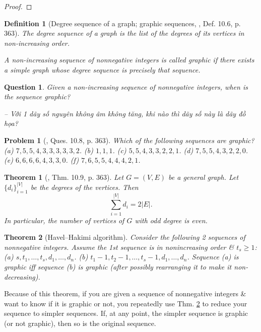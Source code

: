 \documentclass[oneside]{book}
\newtheorem{definition}{Definition}
\newtheorem{problem}{Problem}
\newtheorem{question}{Question}
\newtheorem{theorem}{Theorem}
\begin{document}
\begin{proof}
	
\end{proof}

\begin{definition}[Degree sequence of a graph; graphic sequences, \cite{Shahriari2022}, Def. 10.6, p. 363]
	The {\rm degree sequence} of a graph is the list of the degrees of its vertices in non-increasing order.
	
	A non-increasing sequence of nonnegative integers is called {\rm graphic} if there exists a simple graph whose degree sequence is precisely that sequence.
\end{definition}

\begin{question}
	Given a non-increasing sequence of nonnegative integers, when is the sequence graphic?
	
	-- Với 1 dãy số nguyên không âm không tăng, khi nào thì dãy số này là dãy đồ họa?
\end{question}

\begin{problem}[\cite{Shahriari2022}, Ques. 10.8, p. 363]
	Which of the following sequences are graphic? (a) $7,5,5,4,3,3,3,3,3,2$. (b) $1,1,1$. (c) $5,5,4,3,3,2,2,1$. (d) $7,5,5,4,3,2,2,0$. (e) $6,6,6,6,4,3,3,0$. (f) $7,6,5,5,4,4,4,2,1$.
\end{problem}

\begin{theorem}[\cite{Shahriari2022}, Thm. 10.9, p. 363]
	\label{thm: Euler}
	Let $G = (V,E)$ be a general graph. Let $\{d_i\}_{i=1}^{|V|}$ be the degrees of the vertices. Then
	\begin{equation*}
		\sum_{i=1}^{|V|} d_i = 2|E|.
	\end{equation*}
	In particular, the number of vertices of $G$ with odd degree is even.
\end{theorem}

\begin{theorem}[Havel--Hakimi algorithm]
	\label{thm: Havel--Hakimi algorithm}
	Consider the following 2 sequences of nonnegative integers. Assume the 1st sequence is in nonincreasing order \& $t_s\ge1$: (a) $s,t_1,\ldots,t_s,d_1,\ldots,d_n$. (b) $t_1 - 1,t_2 - 1,\ldots,t_s - 1,d_1,\ldots,d_n$. Sequence (a) is graphic iff sequence (b) is graphic (after possibly rearranging it to make it non-decreasing).
\end{theorem}
Because of this theorem, if you are given a sequence of nonnegative integers \& want to know if it is graphic or not, you repeatedly use Thm. \ref{thm: Havel--Hakimi algorithm} to reduce your sequence to simpler sequences. If, at any point, the simpler sequence is graphic (or not graphic), then so is the original sequence.
\end{document}
